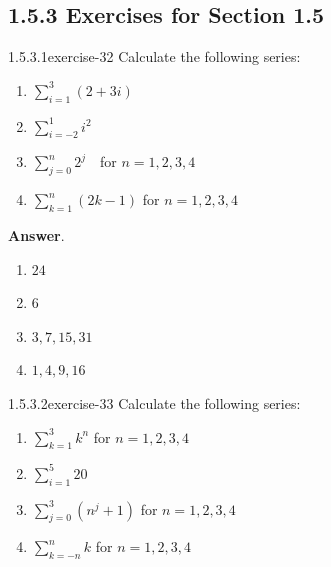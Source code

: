 \documentclass[twoside,10pt,]{book}
\numberwithin{equation}{section}
\begin{document}
\subsection*{1.5.3 Exercises for Section 1.5}
\begin{divisionsolution}{1.5.3.1}{}{exercise-32}%
\hypertarget{p-501}{}%
Calculate the following series:%
\par
\hypertarget{p-502}{}%
\leavevmode%
\begin{multicols}{2}
\begin{enumerate}[label=(\alph*)]
\item\hypertarget{li-359}{}\hypertarget{p-503}{}%
\(\sum_{i=1}^3 (2 + 3i)\)%
\item\hypertarget{li-360}{}\hypertarget{p-504}{}%
\(\sum_{i=-2}^1 i^2\)%
\item\hypertarget{li-361}{}\hypertarget{p-505}{}%
\(\sum_{j=0}^n 2^j\text{   }\) for \(n= 1, 2, 3, 4\)%
\item\hypertarget{li-362}{}\hypertarget{p-506}{}%
\(\sum_{k=1}^n (2k-1)\) for \(n = 1, 2, 3, 4\)%
\end{enumerate}
\end{multicols}
%
\par\smallskip%
\noindent\textbf{Answer}.\quad%
\hypertarget{p-507}{}%
\leavevmode%
\begin{multicols}{2}
\begin{enumerate}[label=(\alph*)]
\item\hypertarget{li-363}{}\hypertarget{p-508}{}%
\(24\)%
\item\hypertarget{li-364}{}\hypertarget{p-509}{}%
\(6\)%
\item\hypertarget{li-365}{}\hypertarget{p-510}{}%
\(3,7,15,31\)%
\item\hypertarget{li-366}{}\hypertarget{p-511}{}%
\(1,4,9,16\)%
\end{enumerate}
\end{multicols}
%
\end{divisionsolution}%
\begin{divisionsolution}{1.5.3.2}{}{exercise-33}%
\hypertarget{p-512}{}%
Calculate the following series:%
\par
\hypertarget{p-513}{}%
\leavevmode%
\begin{enumerate}[label=(\alph*)]
\item\hypertarget{li-367}{}\hypertarget{p-514}{}%
\(\sum_{k=1}^3 k^n\) for \(n = 1, 2, 3, 4\)%
\item\hypertarget{li-368}{}\hypertarget{p-515}{}%
\(\sum_{i=1}^5 20\)%
\item\hypertarget{li-369}{}\hypertarget{p-516}{}%
\(\sum_{j=0}^3 \left(n^j+1\right)\) for \(n = 1, 2, 3,4\)%
\item\hypertarget{li-370}{}\hypertarget{p-517}{}%
\(\sum_{k=-n}^n k\) for \(n = 1, 2, 3, 4\)%
\end{enumerate}
%
\end{divisionsolution}%
\end{document}

